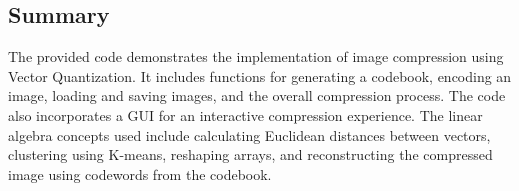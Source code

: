 \documentclass{article}
\begin{document}
\subsection{Summary}

The provided code demonstrates the implementation of image compression using Vector Quantization. It includes functions for generating a codebook, encoding an image, loading and saving images, and the overall compression process. The code also incorporates a GUI for an interactive compression experience. The linear algebra concepts used include calculating Euclidean distances between vectors, clustering using K-means, reshaping arrays, and reconstructing the compressed image using codewords from the codebook.
\end{document}
